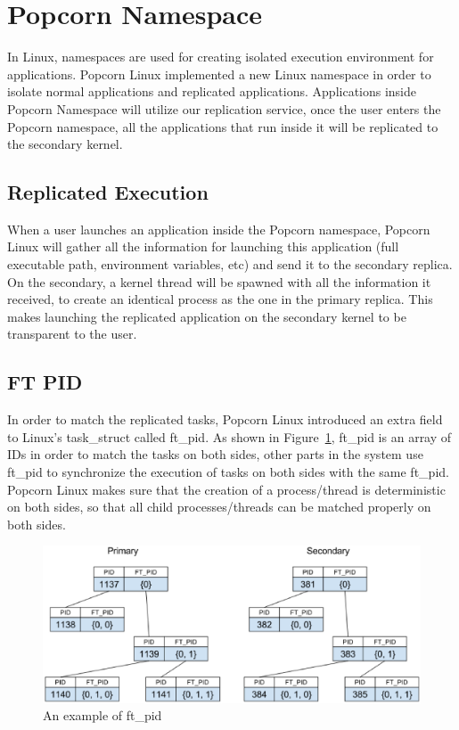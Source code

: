 \section{Popcorn Namespace}
In Linux, namespaces are used for creating isolated execution environment for applications. Popcorn Linux implemented a new Linux namespace in order to isolate normal applications and replicated applications. Applications inside Popcorn Namespace will utilize our replication service, once the user enters the Popcorn namespace, all the applications that run inside it will be replicated to the secondary kernel.

\subsection{Replicated Execution}
When a user launches an application inside the Popcorn namespace, Popcorn Linux will gather all the information for launching this application (full executable path, environment variables, etc) and send it to the secondary replica. On the secondary, a kernel thread will be spawned with all the information it received, to create an identical process as the one in the primary replica. This makes launching the replicated application on the secondary kernel to be transparent to the user.

\subsection{FT PID}
In order to match the replicated tasks, Popcorn Linux introduced an extra field to Linux's task\_struct called ft\_pid. As shown in Figure~\ref{f:ft_pid}, ft\_pid is an array of IDs in order to match the tasks on both sides, other parts in the system use ft\_pid to synchronize the execution of tasks on both sides with the same ft\_pid. Popcorn Linux makes sure that the creation of a process/thread is deterministic on both sides, so that all child processes/threads can be matched properly on both sides.
\begin{figure}[!ht]
\centering
\includegraphics[width=.9575\columnwidth]{figures/ft_pid}
 \caption{An example of ft\_pid}
 \label{f:ft_pid}
\end{figure}


